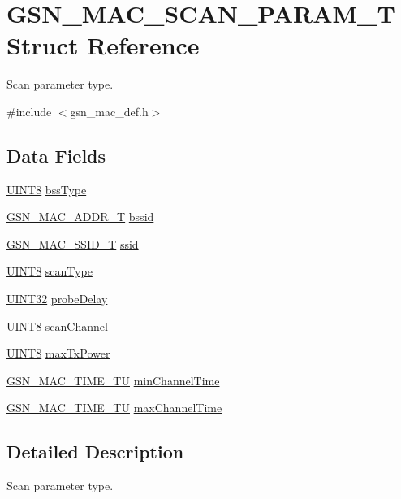 \hypertarget{a00130}{
\section{GSN\_\-MAC\_\-SCAN\_\-PARAM\_\-T Struct Reference}
\label{a00130}
}


Scan parameter type.  




{\ttfamily \#include $<$gsn\_\-mac\_\-def.h$>$}

\subsection*{Data Fields}
\begin{DoxyCompactItemize}
\item 
\hyperlink{a00660_gab27e9918b538ce9d8ca692479b375b6a}{UINT8} \hyperlink{a00130_a3bb46411ce5a127fcf6784f1644f0921}{bssType}
\item 
\hyperlink{a00416}{GSN\_\-MAC\_\-ADDR\_\-T} \hyperlink{a00130_a0c8072b3bb52f68906a0aacd382de7c2}{bssid}
\item 
\hyperlink{a00417}{GSN\_\-MAC\_\-SSID\_\-T} \hyperlink{a00130_a1bc7788a828e29446580aa10a5ac2932}{ssid}
\item 
\hyperlink{a00660_gab27e9918b538ce9d8ca692479b375b6a}{UINT8} \hyperlink{a00130_a000a5568cb4c2c12ad873696b2d6f83e}{scanType}
\item 
\hyperlink{a00660_gae1e6edbbc26d6fbc71a90190d0266018}{UINT32} \hyperlink{a00130_a65f7529d80c77db8f777b2f544345db7}{probeDelay}
\item 
\hyperlink{a00660_gab27e9918b538ce9d8ca692479b375b6a}{UINT8} \hyperlink{a00130_a17f8f4dca152d72705ca878cf313aa41}{scanChannel}
\item 
\hyperlink{a00660_gab27e9918b538ce9d8ca692479b375b6a}{UINT8} \hyperlink{a00130_a7cd081227ed796284bdbaf79788a39a5}{maxTxPower}
\item 
\hyperlink{a00522_a4357e93aba9b5a4deb42a1b85eb03053}{GSN\_\-MAC\_\-TIME\_\-TU} \hyperlink{a00130_a73104a45d2e7df35ab2fa7cb1058d46e}{minChannelTime}
\item 
\hyperlink{a00522_a4357e93aba9b5a4deb42a1b85eb03053}{GSN\_\-MAC\_\-TIME\_\-TU} \hyperlink{a00130_ab2de5b015a5594a87829f4fb80f67fcf}{maxChannelTime}
\end{DoxyCompactItemize}


\subsection{Detailed Description}
Scan parameter type. 

